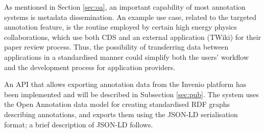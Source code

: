 
As mentioned in Section \ref{sec:oa}, an important capability of most
annotation systems is metadata dissemination. An example use case, related to
the targeted annotation feature, is the routine employed by certain high energy
physics collaborations, which use both CDS and an external application
(TWiki) for their paper review process. Thus, the possibility of transferring
data between applications in a standardised manner could simplify both the
users' workflow and the development process for application providers.

An API that allows exporting annotation data from the Invenio platform has been
implemented and will be described in Subsection \ref{sec:pub}. The system uses
the Open Annotation data model for creating standardised RDF graphs describing
annotations, and exports them using the JSON-LD serialisation format; a brief
description of JSON-LD follows.
